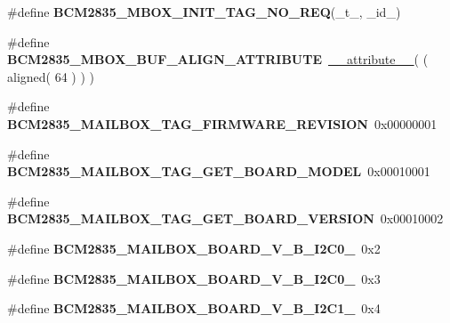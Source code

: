 \begin{DoxyCompactItemize}
\item 
\#define {\bfseries B\+C\+M2835\+\_\+\+M\+B\+O\+X\+\_\+\+I\+N\+I\+T\+\_\+\+T\+A\+G\+\_\+\+N\+O\+\_\+\+R\+EQ}(\+\_\+t\+\_\+,  \+\_\+id\+\_\+)
\item 
\mbox{\label{group__raspberrypi__vc_ga8b25d99a53dc716c971045dee9b086fc}} 
\#define {\bfseries B\+C\+M2835\+\_\+\+M\+B\+O\+X\+\_\+\+B\+U\+F\+\_\+\+A\+L\+I\+G\+N\+\_\+\+A\+T\+T\+R\+I\+B\+U\+TE}~\mbox{\hyperlink{struct____attribute____}{\+\_\+\+\_\+attribute\+\_\+\+\_\+}}( ( aligned( 64 ) ) )
\item 
\mbox{\label{group__raspberrypi__vc_ga137fd2df1316d44587d5a34b78a85b58}} 
\#define {\bfseries B\+C\+M2835\+\_\+\+M\+A\+I\+L\+B\+O\+X\+\_\+\+T\+A\+G\+\_\+\+F\+I\+R\+M\+W\+A\+R\+E\+\_\+\+R\+E\+V\+I\+S\+I\+ON}~0x00000001
\item 
\mbox{\label{group__raspberrypi__vc_gabe41043e23f5eddc49c8b6d77a41b723}} 
\#define {\bfseries B\+C\+M2835\+\_\+\+M\+A\+I\+L\+B\+O\+X\+\_\+\+T\+A\+G\+\_\+\+G\+E\+T\+\_\+\+B\+O\+A\+R\+D\+\_\+\+M\+O\+D\+EL}~0x00010001
\item 
\mbox{\label{group__raspberrypi__vc_ga28776efd79962afa0ff244606006c20d}} 
\#define {\bfseries B\+C\+M2835\+\_\+\+M\+A\+I\+L\+B\+O\+X\+\_\+\+T\+A\+G\+\_\+\+G\+E\+T\+\_\+\+B\+O\+A\+R\+D\+\_\+\+V\+E\+R\+S\+I\+ON}~0x00010002
\item 
\mbox{\label{group__raspberrypi__vc_ga84b8f3bf8a714ab397476897645be9ac}} 
\#define {\bfseries B\+C\+M2835\+\_\+\+M\+A\+I\+L\+B\+O\+X\+\_\+\+B\+O\+A\+R\+D\+\_\+\+V\+\_\+\+B\+\_\+\+I2\+C0\+\_}~0x2
\item 
\mbox{\label{group__raspberrypi__vc_ga31b68b3b08b0a5d8ea4e103ec3c337cd}} 
\#define {\bfseries B\+C\+M2835\+\_\+\+M\+A\+I\+L\+B\+O\+X\+\_\+\+B\+O\+A\+R\+D\+\_\+\+V\+\_\+\+B\+\_\+\+I2\+C0\+\_}~0x3
\item 
\mbox{\label{group__raspberrypi__vc_ga8b6b01ddb618918e52da61a78250ba85}} 
\#define {\bfseries B\+C\+M2835\+\_\+\+M\+A\+I\+L\+B\+O\+X\+\_\+\+B\+O\+A\+R\+D\+\_\+\+V\+\_\+\+B\+\_\+\+I2\+C1\+\_}~0x4
\item 

\end{DoxyCompactItemize}
